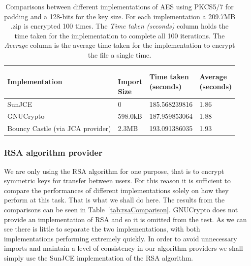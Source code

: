 \documentclass[12pt, titlepage]{article}
\begin{document}
\begin{center}
\begin{table}[H]
    \begin{tabular}{ | l | l | l | l |}
    \hline
    \textbf{Implementation} & \shortstack{\\ \textbf{Import} \\ \textbf{Size}} & \shortstack{\textbf{Time taken} \\ \textbf{(seconds)}} & \shortstack{\textbf{Average} \\ \textbf{(seconds)}} \\ \hline
    
    SunJCE & 0 & 185.568239816 & 1.86 \\ \hline
    
    GNUCrypto & 598.0kB & 187.959853064 & 1.88 \\ \hline
    
    Bouncy Castle (via JCA provider) & 2.3MB & 193.091386035 & 1.93 \\ \hline
    
    \end{tabular}
    \caption{Comparisons between different implementations of AES using PKCS5/7 for padding and a 128-bits for the key size. For each implementation a 209.7MB .zip is encrypted 100 times. The \textit{Time taken (seconds)} column holds the time taken for the implementation to complete all 100 iterations. The \textit{Average} column is the average time taken for the implementation to encrypt the file a single time.} \label{tab:aes.zipComparison}
    \end{table}
\end{center}


\subsubsection{RSA algorithm provider}
We are only using the RSA algorithm for one purpose, that is to encrypt symmetric keys for transfer between users. For this reason it is sufficient to compare the performances of different implementations solely on how they perform at this task. That is what we shall do here.
\newline \indent The results from the comparisons can be seen in Table~\ref{tab:rsaComparison}. GNUCrypto does not provide an implementation of RSA and so it is omitted from the test. As we can see there is little to separate the two implementations, with both implementations performing extremely quickly.
\newline \indent In order to avoid unnecessary imports and maintain a level of consistency in our algorithm providers we shall simply use the SunJCE implementation of the RSA algorithm.
\end{document}
